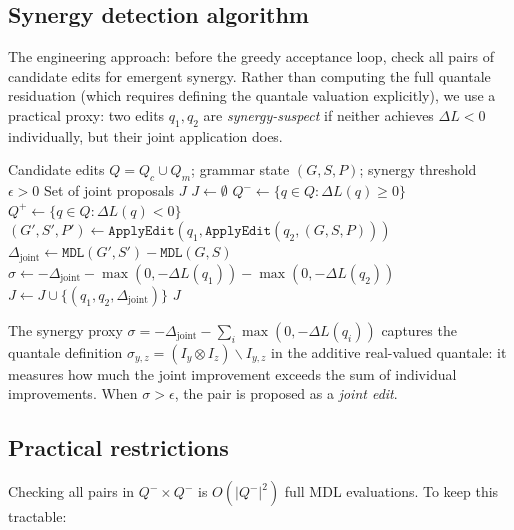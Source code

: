 \documentclass[11pt]{article}
\begin{document}
\subsection{Synergy detection algorithm}

The engineering approach: before the greedy acceptance loop, check all pairs of candidate edits for emergent synergy.  Rather than computing the full quantale residuation (which requires defining the quantale valuation explicitly), we use a practical proxy: two edits $q_1, q_2$ are \emph{synergy-suspect} if neither achieves $\Delta L < 0$ individually, but their joint application does.

\begin{algorithm}
\caption{Synergy-aware joint proposal detection}
\label{alg:synergy}
\begin{algorithmic}[1]
\Require Candidate edits $Q = Q_c \cup Q_m$; grammar state $(G, S, P)$; synergy threshold $\epsilon > 0$
\Ensure Set of joint proposals $J$
\State $J \gets \emptyset$
\State $Q^- \gets \{q \in Q : \Delta L(q) \geq 0\}$ 
\State $Q^+ \gets \{q \in Q : \Delta L(q) < 0\}$ 
  \State $(G', S', P') \gets \texttt{ApplyEdit}(q_1, \texttt{ApplyEdit}(q_2, (G, S, P)))$
  \State $\Delta_{\text{joint}} \gets \texttt{MDL}(G', S') - \texttt{MDL}(G, S)$
  \State $\sigma \gets -\Delta_{\text{joint}} - \max(0, -\Delta L(q_1)) - \max(0, -\Delta L(q_2))$ 
  \If{$\sigma > \epsilon$}
    \State $J \gets J \cup \{(q_1, q_2, \Delta_{\text{joint}})\}$
  \EndIf
\EndFor
\State \Return $J$
\end{algorithmic}
\end{algorithm}

The synergy proxy $\sigma = -\Delta_{\text{joint}} - \sum_i \max(0, -\Delta L(q_i))$ captures the quantale definition $\sigma_{y,z} = (I_y \otimes I_z) \backslash I_{y,z}$ in the additive real-valued quantale: it measures how much the joint improvement exceeds the sum of individual improvements.  When $\sigma > \epsilon$, the pair is proposed as a \emph{joint edit}.

\subsection{Practical restrictions}

Checking all pairs in $Q^- \times Q^-$ is $O(|Q^-|^2)$ full MDL evaluations.  To keep this tractable:
\end{document}
